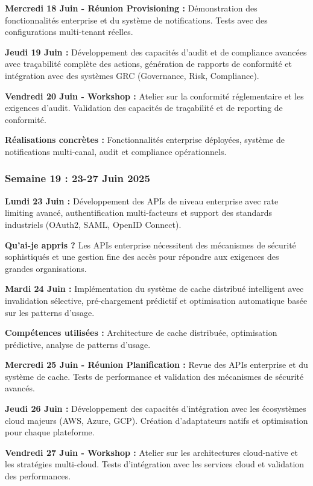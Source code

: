 \documentclass[a4paper,12pt]{article}
\begin{document}
\textbf{Mercredi 18 Juin - Réunion Provisioning :}
Démonstration des fonctionnalités enterprise et du système de notifications. Tests avec des configurations multi-tenant réelles.

\textbf{Jeudi 19 Juin :}
Développement des capacités d'audit et de compliance avancées avec traçabilité complète des actions, génération de rapports de conformité et intégration avec des systèmes GRC (Governance, Risk, Compliance).

\textbf{Vendredi 20 Juin - Workshop :}
Atelier sur la conformité réglementaire et les exigences d'audit. Validation des capacités de traçabilité et de reporting de conformité.

\textbf{Réalisations concrètes :} Fonctionnalités enterprise déployées, système de notifications multi-canal, audit et compliance opérationnels.

\subsubsection{Semaine 19 : 23-27 Juin 2025}

\textbf{Lundi 23 Juin :}
Développement des APIs de niveau enterprise avec rate limiting avancé, authentification multi-facteurs et support des standards industriels (OAuth2, SAML, OpenID Connect).

\textbf{Qu'ai-je appris ?} Les APIs enterprise nécessitent des mécanismes de sécurité sophistiqués et une gestion fine des accès pour répondre aux exigences des grandes organisations.

\textbf{Mardi 24 Juin :}
Implémentation du système de cache distribué intelligent avec invalidation sélective, pré-chargement prédictif et optimisation automatique basée sur les patterns d'usage.

\textbf{Compétences utilisées :} Architecture de cache distribuée, optimisation prédictive, analyse de patterns d'usage.

\textbf{Mercredi 25 Juin - Réunion Planification :}
Revue des APIs enterprise et du système de cache. Tests de performance et validation des mécanismes de sécurité avancés.

\textbf{Jeudi 26 Juin :}
Développement des capacités d'intégration avec les écosystèmes cloud majeurs (AWS, Azure, GCP). Création d'adaptateurs natifs et optimisation pour chaque plateforme.

\textbf{Vendredi 27 Juin - Workshop :}
Atelier sur les architectures cloud-native et les stratégies multi-cloud. Tests d'intégration avec les services cloud et validation des performances.
\end{document}
